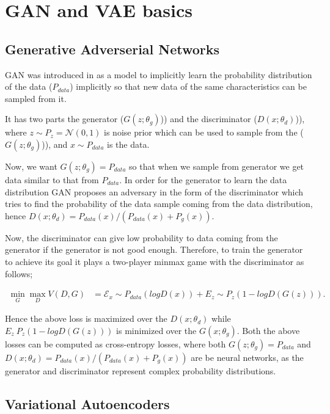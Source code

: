 \documentclass{article}
\begin{document}
	\section{GAN and VAE basics}\label{section:GanAndVae}
	
	
	\subsection{Generative Adverserial Networks}\label{subsection:Gan}
	
	GAN was introduced in \cite{GoodfellowGenerative:2014} as a model to implicitly learn the probability distribution of the data ($P_{data}$) implicitly so that new data of the same characteristics can be sampled from it. 
	
	It has two parts the generator ($G(z;\theta_{g})$)) and the discriminator ($D(x;\theta_{d})$)), where $z\sim P_{z}=\mathcal{N}(0,1)$  is noise prior which can be used to sample from the ($G(z;\theta_{g})$)), and $x\sim P_{data}$ is the data.
	
	Now, we want $G(z;\theta_{g}) = P_{data}$ so that when we sample from generator we get data similar to that from $P_{data}$. In order for the generator to learn the data distribution GAN proposes an adversary in the form of the discriminator which tries to find the probability of the data sample coming from the data distribution, hence $D(x;\theta_{d})=P_{data}(x)/(P_{data}(x)+P_{g}(x))$. 
	
	Now, the discriminator can give low probability to data coming from the generator if the generator is not good enough. Therefore, to train the generator to achieve its goal it plays a two-player minmax game with the discriminator as follows;
	
	\begin{align} 
		\min_{G} \max_{D} V(D,G) &= \mathcal{E}_x\sim P_{data}(logD(x)) + {E}_z\sim P_{z}(1-logD(G(z))). \nonumber
	\end{align} 

	Hence the above loss is maximized over the $D(x;\theta_{d})$ while ${E}_z~P_{z}(1-logD(G(z)))$ is minimized over the $G(x;\theta_{g})$. Both the above losses can be computed as cross-entropy losses, where both $G(z;\theta_{g}) = P_{data}$ and $D(x;\theta_{d})=P_{data}(x)/(P_{data}(x)+P_{g}(x))$ are be neural networks, as the generator and discriminator represent complex probability distributions.     
	
	\subsection{Variational Autoencoders}\label{subsection:Vae}
	
\end{document}
